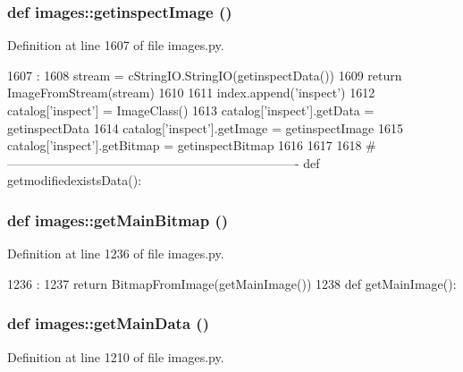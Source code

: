 \hypertarget{namespaceimages_ab010b84c06594546f384ae7fa79a0fa8}{
\subsubsection[{getinspectImage}]{\setlength{\rightskip}{0pt plus 5cm}def images::getinspectImage ()}}
\label{namespaceimages_ab010b84c06594546f384ae7fa79a0fa8}


Definition at line 1607 of file images.py.


\begin{DoxyCode}
1607                      :
1608     stream = cStringIO.StringIO(getinspectData())
1609     return ImageFromStream(stream)
1610 
1611 index.append('inspect')
1612 catalog['inspect'] = ImageClass()
1613 catalog['inspect'].getData = getinspectData
1614 catalog['inspect'].getImage = getinspectImage
1615 catalog['inspect'].getBitmap = getinspectBitmap
1616 
1617 
1618 #----------------------------------------------------------------------
def getmodifiedexistsData():
\end{DoxyCode}
\hypertarget{namespaceimages_a27714775d4cb6eac3bd7e159d6e46c63}{
\subsubsection[{getMainBitmap}]{\setlength{\rightskip}{0pt plus 5cm}def images::getMainBitmap ()}}
\label{namespaceimages_a27714775d4cb6eac3bd7e159d6e46c63}


Definition at line 1236 of file images.py.


\begin{DoxyCode}
1236                    :
1237     return BitmapFromImage(getMainImage())
1238 
def getMainImage():
\end{DoxyCode}
\hypertarget{namespaceimages_abb6f8c57ef114aa26e09f052de32ee37}{
\subsubsection[{getMainData}]{\setlength{\rightskip}{0pt plus 5cm}def images::getMainData ()}}
\label{namespaceimages_abb6f8c57ef114aa26e09f052de32ee37}


Definition at line 1210 of file images.py.


